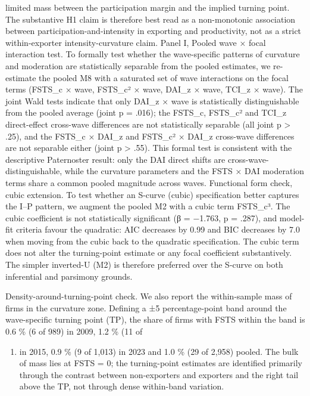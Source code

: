 \documentclass[12pt,a4paper]{article}
\providecommand{\tightlist}{\setlength{\itemsep}{0pt}\setlength{\parskip}{0pt}}
\begin{document}
limited mass between the participation margin and the implied turning
point. The substantive H1 claim is therefore best read as a
non-monotonic association between participation-and-intensity in
exporting and productivity, not as a strict within-exporter
intensity-curvature claim. Panel I, Pooled wave × focal interaction
test. To formally test whether the wave-specific patterns of curvature
and moderation are statistically separable from the pooled estimates, we
re-estimate the pooled M8 with a saturated set of wave interactions on
the focal terms (FSTS\_c × wave, FSTS\_c² × wave, DAI\_z × wave, TCI\_z
× wave). The joint Wald tests indicate that only DAI\_z × wave is
statistically distinguishable from the pooled average (joint p = .016);
the FSTS\_c, FSTS\_c² and TCI\_z direct-effect cross-wave differences
are not statistically separable (all joint p \textgreater{} .25), and
the FSTS\_c × DAI\_z and FSTS\_c² × DAI\_z cross-wave differences are
not separable either (joint p \textgreater{} .55). This formal test is
consistent with the descriptive Paternoster result: only the DAI direct
shifts are cross-wave-distinguishable, while the curvature parameters
and the FSTS × DAI moderation terms share a common pooled magnitude
across waves. Functional form check, cubic extension. To test whether an
S-curve (cubic) specification better captures the I--P pattern, we
augment the pooled M2 with a cubic term FSTS\_c³. The cubic coefficient
is not statistically significant (β = −1.763, p = .287), and model-fit
criteria favour the quadratic: AIC decreases by 0.99 and BIC decreases
by 7.0 when moving from the cubic back to the quadratic specification.
The cubic term does not alter the turning-point estimate or any focal
coefficient substantively. The simpler inverted-U (M2) is therefore
preferred over the S-curve on both inferential and parsimony grounds.

Density-around-turning-point check. We also report the within-sample
mass of firms in the curvature zone. Defining a ±5 percentage-point band
around the wave-specific turning point (TP), the share of firms with
FSTS within the band is 0.6 \% (6 of 989) in 2009, 1.2 \% (11 of

\begin{enumerate}
\def\labelenumi{\arabic{enumi})}
\setcounter{enumi}{955}
\tightlist
\item
  in 2015, 0.9 \% (9 of 1,013) in 2023 and 1.0 \% (29 of 2,958) pooled.
  The bulk of mass lies at FSTS = 0; the turning-point estimates are
  identified primarily through the contrast between non-exporters and
  exporters and the right tail above the TP, not through dense
  within-band variation.
\end{enumerate}
\end{document}
